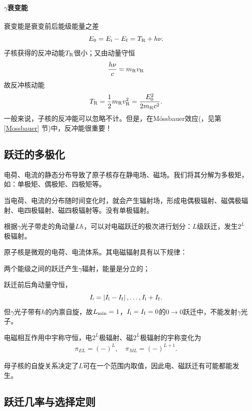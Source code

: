 \paragraph{$\gamma$衰变能}
衰变能是衰变前后能级能量之差
\[
	E_0=E_{\mathrm{i}}-E_{\mathrm{f}}=T_{\mathrm{R}}+h\nu.
\]
子核获得的反冲动能$T_{\mathrm{R}}$很小；又由动量守恒
\[
	\frac{h\nu}c=m_{\mathrm{R}}v_{\mathrm{R}}
\]
故反冲核动能
\begin{align}
	T_{\mathrm{R}}=\frac12m_{\mathrm{R}}v_{\mathrm{R}}^2=\frac{E_0^2}{2m_{\mathrm{R}}c^2}.
\end{align}
一般来说，子核的反冲能可以忽略不计。但是，在Mössbauer效应(，见第 \ref{Mossbauer} 节)中，反冲能很重要！

\subsection{\textgamma 跃迁的多极化}

电荷、电流的静态分布导致了原子核存在静电场、磁场。我们将其分解为多极矩，如：单极矩、偶极矩、四极矩等。

当电荷、电流的分布随时间变化时，就会产生辐射场，形成电偶极辐射、磁偶极辐射、电四极辐射、磁四极辐射等。没有单极辐射。

根据$\gamma$光子带走的角动量$L\hbar$，可以对电磁跃迁的极次进行划分：$L$级跃迁，发生$2^L$极辐射。

原子核是微观的电荷、电流体系。其电磁辐射具有以下规律：
\begin{compactenum}
	\item 两个能级之间的跃迁产生$\gamma$辐射，能量是分立的；
	\item 跃迁前后角动量守恒，
	\[
		L=\left\lvert I_{\mathrm{i}}-I_{\mathrm{f}}\right\rvert,\ldots,I_{\mathrm{i}}+I_{\mathrm{f}}.
	\]
	但$\gamma$光子带有$\hbar$的内禀自旋，故$L_\mathrm{min}=1$，$I_{\mathrm{i}}=I_{\mathrm{f}}=0$的$0\to0$跃迁中，不能发射$\gamma$光子。
	\item 电磁相互作用中宇称守恒，电$2^L$极辐射、磁$2^L$极辐射的宇称变化为
	\begin{align}
		\pi_{EL}=(-)^L,\quad\pi_{ML}=(-)^{L+1}.
	\end{align}
\end{compactenum}
母子核的自旋关系决定了$L$可在一个范围内取值，因此电、磁跃迁有可能都能发生。

\subsection{\textgamma 跃迁几率与选择定则}

